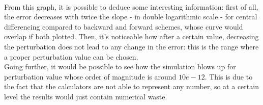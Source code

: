 \\[4pt] From this graph, it is possible to deduce some interesting information: first of all, the error decreases with twice the slope - in double logarithmic scale - for central differencing compared to backward and forward schemes, whose curve would overlap if both plotted. Then, it's noticeable how after a certain value, decreasing the perturbation does not lead to any change in the error: this is the range where a proper perturbation value can be chosen. \\[3pt]
Going further, it would be possible to see how the simulation blows up for perturbation value whose order of magnitude is around $10e-12$. This is due to the fact that the calculators are not able to represent any number, so at a certain level the results would just contain numerical waste.
